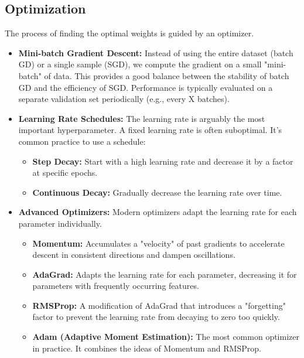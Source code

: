 \documentclass{article}
\begin{document}
\begin{multicols}{2}
	\subsection{Optimization}
	The process of finding the optimal weights is guided by an optimizer.
	\begin{itemize}
		\item \textbf{Mini-batch Gradient Descent:} Instead of using the entire dataset (batch GD) or a single sample (SGD), we compute the gradient on a small "mini-batch" of data. This provides a good balance between the stability of batch GD and the efficiency of SGD. Performance is typically evaluated on a separate validation set periodically (e.g., every X batches).
		\item \textbf{Learning Rate Schedules:} The learning rate is arguably the most important hyperparameter. A fixed learning rate is often suboptimal. It's common practice to use a schedule:
		      \begin{itemize}
			      \item \textbf{Step Decay:} Start with a high learning rate and decrease it by a factor at specific epochs.
			      \item \textbf{Continuous Decay:} Gradually decrease the learning rate over time.
		      \end{itemize}
		\item \textbf{Advanced Optimizers:} Modern optimizers adapt the learning rate for each parameter individually.
		      \begin{itemize}
			      \item \textbf{Momentum:} Accumulates a "velocity" of past gradients to accelerate descent in consistent directions and dampen oscillations.
			      \item \textbf{AdaGrad:} Adapts the learning rate for each parameter, decreasing it for parameters with frequently occurring features.
			      \item \textbf{RMSProp:} A modification of AdaGrad that introduces a "forgetting" factor to prevent the learning rate from decaying to zero too quickly.
			      \item \textbf{Adam (Adaptive Moment Estimation):} The most common optimizer in practice. It combines the ideas of Momentum and RMSProp.
		      \end{itemize}
	\end{itemize}


\end{multicols}
\end{document}

